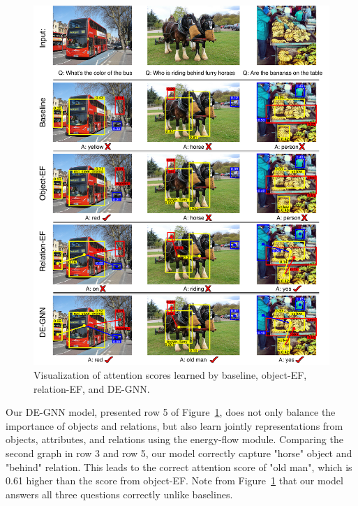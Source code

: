 \documentclass[letterpaper]{article} %
\begin{document}
\begin{figure}[h] 
    \flushleft
    \centering 
    \includegraphics[scale=0.32]{./pic/visual2.pdf} 
    \caption{Visualization of attention scores learned by baseline, object-EF, relation-EF, and DE-GNN.} 
    \label{visual}
\end{figure}

Our DE-GNN model, presented row 5 of Figure~\ref{visual}, does not only balance the importance of objects and relations, but also learn jointly representations from objects, attributes, and relations using the energy-flow module. Comparing the second graph in row 3 and row 5, our model correctly capture "horse" object and "behind" relation. This leads to the correct attention score of "old man", which is 0.61 higher than the score from object-EF. 
Note from Figure~\ref{visual} that our model answers all three questions correctly unlike baselines.
\end{document}
